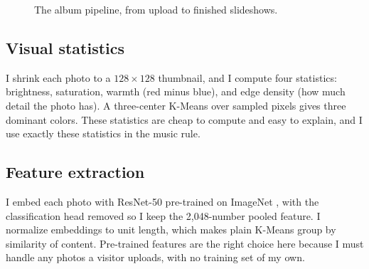 \documentclass[conference]{IEEEtran}
\begin{document}
\begin{figure}[htbp]
\begin{center}
\caption{The album pipeline, from upload to finished slideshows.}
\label{fig:pipeline}
\end{center}
\end{figure}

\subsection{Visual statistics}
I shrink each photo to a $128 \times 128$ thumbnail, and I compute
four statistics: brightness, saturation, warmth (red minus blue),
and edge density (how much detail the photo has). A three-center
K-Means over sampled pixels gives three dominant colors. These
statistics are cheap to compute and easy to explain, and I use
exactly these statistics in the music rule.

\subsection{Feature extraction}
I embed each photo with ResNet-50 pre-trained on ImageNet
\cite{deng2009}, with the classification head removed so I keep
the 2,048-number pooled feature. I normalize embeddings to unit
length, which makes plain K-Means group by similarity of content.
Pre-trained features are the right choice here because I must
handle any photos a visitor uploads, with no training set of my
own.
\end{document}
